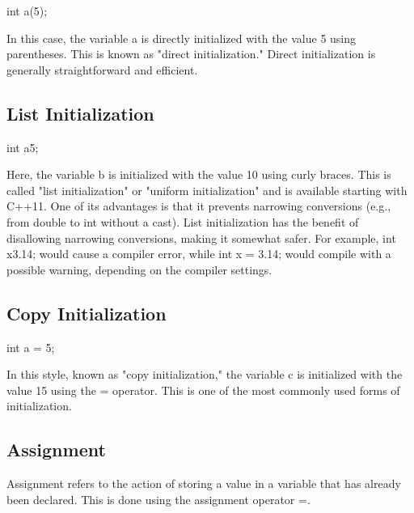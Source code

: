 \documentclass{report}
\begin{document}
    \begin{cppcode}
int a(5);
    \end{cppcode}
    
    \bigbreak \noindent 
    In this case, the variable a is directly initialized with the value 5 using parentheses. This is known as "direct initialization." Direct initialization is generally straightforward and efficient.

    \bigbreak \noindent 
    \subsection{List Initialization}
    \bigbreak \noindent 
    
    \begin{cppcode}
int a{5};
    \end{cppcode}
    
    \bigbreak \noindent 
    Here, the variable b is initialized with the value 10 using curly braces. This is called "list initialization" or "uniform initialization" and is available starting with C++11. One of its advantages is that it prevents narrowing conversions (e.g., from double to int without a cast).
    \bigbreak \noindent 
    List initialization has the benefit of disallowing narrowing conversions, making it somewhat safer. For example, int x{3.14}; would cause a compiler error, while int x = 3.14; would compile with a possible warning, depending on the compiler settings.

    \bigbreak \noindent 
    \subsection{Copy Initialization}
    \bigbreak \noindent 
    
    \begin{cppcode}
int a = 5;
    \end{cppcode}
    
    \bigbreak \noindent 
    In this style, known as "copy initialization," the variable c is initialized with the value 15 using the = operator. This is one of the most commonly used forms of initialization.



    \bigbreak \noindent 
    \subsection{Assignment}
    \bigbreak \noindent 
    Assignment refers to the action of storing a value in a variable that has already been declared. This is done using the assignment operator =.
    \bigbreak \noindent 
    
\end{document}
